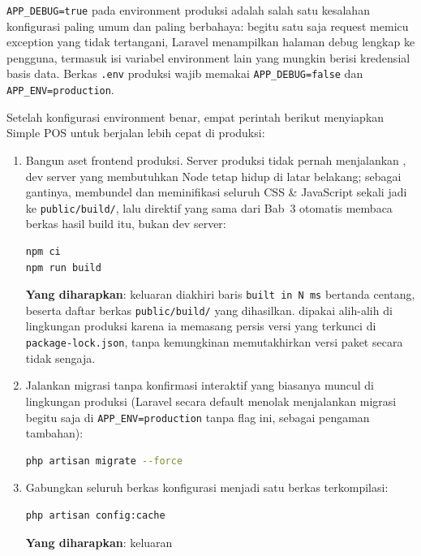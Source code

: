\begin{warningbox}
\texttt{APP\_DEBUG=true} pada environment produksi adalah salah satu
kesalahan konfigurasi paling umum dan paling berbahaya: begitu satu
saja request memicu exception yang tidak tertangani, Laravel
menampilkan halaman debug lengkap ke pengguna, termasuk isi variabel
environment lain yang mungkin berisi kredensial basis data. Berkas
\texttt{.env} produksi wajib memakai \texttt{APP\_DEBUG=false} dan
\texttt{APP\_ENV=production}.
\end{warningbox}

Setelah konfigurasi environment benar, empat perintah berikut menyiapkan
Simple POS untuk berjalan lebih cepat di produksi:

\begin{enumerate}
  \item Bangun aset frontend produksi. Server produksi tidak pernah
    menjalankan , dev server yang membutuhkan Node tetap
    hidup di latar belakang; sebagai gantinya, 
    membundel dan meminifikasi seluruh CSS \& JavaScript sekali jadi ke
    \texttt{public/build/}, lalu direktif  yang sama dari
    Bab~3 otomatis membaca berkas hasil build itu, bukan dev server:
    \begin{lstlisting}[language=bash]
npm ci
npm run build
    \end{lstlisting}
    \textbf{Yang diharapkan}: keluaran diakhiri baris \texttt{built in N
    ms} bertanda centang, beserta daftar berkas \texttt{public/build/}
    yang dihasilkan.  dipakai alih-alih  di
    lingkungan produksi karena ia memasang persis versi yang terkunci di
    \texttt{package-lock.json}, tanpa kemungkinan memutakhirkan versi
    paket secara tidak sengaja.
  \item Jalankan migrasi tanpa konfirmasi interaktif yang biasanya
    muncul di lingkungan produksi (Laravel secara default menolak
    menjalankan migrasi begitu saja di \texttt{APP\_ENV=production}
    tanpa flag ini, sebagai pengaman tambahan):
    \begin{lstlisting}[language=bash]
php artisan migrate --force
    \end{lstlisting}
  \item Gabungkan seluruh berkas konfigurasi menjadi satu berkas
    terkompilasi:
    \begin{lstlisting}[language=bash]
php artisan config:cache
    \end{lstlisting}
    \textbf{Yang diharapkan}: keluaran

\end{enumerate}
